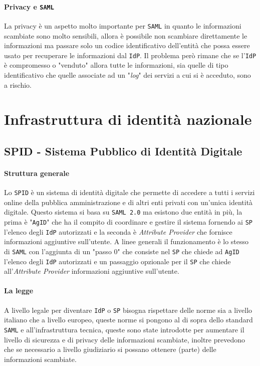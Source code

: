         \paragraph{Privacy e \texttt{SAML}} La privacy è un aspetto molto importante per \texttt{SAML} in quanto le informazioni scambiate sono molto sensibili, allora è possibile non scambiare direttamente le informazioni ma passare solo un codice identificativo dell'entità che possa essere usato per recuperare le informazioni dal \texttt{IdP}. Il problema però rimane che se l'\texttt{IdP} è compromesso o "venduto" allora tutte le informazioni, sia quelle di tipo identificativo che quelle associate ad un "\textit{log}" dei servizi a cui si è acceduto, sono a rischio.
\section{Infrastruttura di identità nazionale}
    \subsection{SPID - Sistema Pubblico di Identità Digitale}
        \paragraph{Struttura generale} Lo \texttt{SPID} è un sistema di identità digitale che permette di accedere a tutti i servizi online della pubblica amministrazione e di altri enti privati con un'unica identità digitale. Questo sistema si basa su \texttt{SAML 2.0} ma esistono due entità in più, la prima è "\texttt{AgID}" che ha il compito di coordinare e gestire il sistema fornendo ai \texttt{SP} l'elenco degli \texttt{IdP} autorizzati e la seconda è \textit{Attribute Provider} che fornisce informazioni aggiuntive sull'utente. A linee generali il funzionamento è lo stesso di \texttt{SAML} con l'aggiunta di un "passo 0" che consiste nel \texttt{SP} che chiede ad \texttt{AgID} l'elenco degli \texttt{IdP} autorizzati e un passaggio opzionale per il \texttt{SP} che chiede all'\textit{Attribute Provider} informazioni aggiuntive sull'utente.
        \paragraph{La legge} A livello legale per diventare \texttt{IdP} o \texttt{SP} bisogna rispettare delle norme sia a livello italiano che a livello europeo, queste norme si pongono al di sopra dello standard \texttt{SAML} e all'infrastruttura tecnica, queste sono state introdotte per aumentare il livello di sicurezza e di privacy delle informazioni scambiate, inoltre prevedono che se necessario a livello giudiziario si possano ottenere (parte) delle informazioni scambiate. 